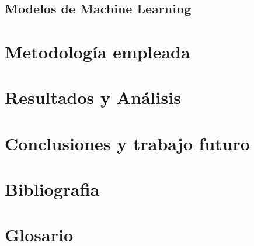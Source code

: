 \documentclass{article}
\begin{document}
\subsection{Modelos de Machine Learning}


\section{Metodología empleada}

\section{Resultados y Análisis}

\section{Conclusiones y trabajo futuro}

\section{Bibliografia}

\section{Glosario}
\end{document}
